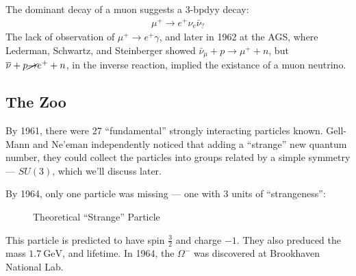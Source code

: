 The dominant decay of a muon suggests a 3-bpdyy decay:
\begin{align*}
  \mu^+\to e^+\nu_e\bar{\nu}_{?}
\end{align*}
The lack of observation of $\mu^+\to e^+\gamma$, and later in 1962 at the AGS, where Lederman, Schwartz, and Steinberger showed $\bar{\nu}_\mu+p\to\mu^++n$, but $\bar{\nu}+p\cancel{\to}e^++n$, in the inverse reaction, implied the existance of a muon neutrino.

\subsection{The Zoo}
By 1961, there were 27 ``fundamental'' strongly interacting particles known. Gell-Mann and Ne'eman independently noticed that adding a ``strange'' new quantum number, they could collect the particles into groups related by a simple symmetry --- $SU(3)$, which we'll discuss later.

By 1964, only one particle was missing --- one with 3 units of ``strangeness'':
\begin{figure}[H]
  \centering
  \caption{Theoretical ``Strange'' Particle}
  \label{fig:strange}
\end{figure}
This particle is predicted to have spin $\frac32$ and charge $-1$. They also preduced the mass $\SI{1.7}{\giga\eV}$, and lifetime. In 1964, the $\Omega^-$ was discovered at Brookhaven National Lab.

